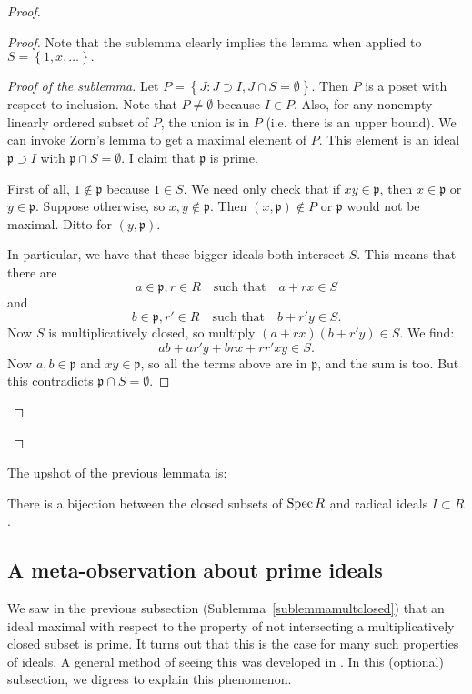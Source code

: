 \begin{proof}
\begin{proof}
Note that the sublemma clearly implies the lemma when applied to
$S =
\left\{1, x, \dots\right\}.$

\begin{proof}[Proof of the sublemma]
Let $P = \left\{J: J \supset I, J \cap S = \emptyset \right\}$.
Then $P$ is a
poset with respect to inclusion. Note that $P \neq \emptyset$
because $I \in P$. Also,
for any nonempty linearly ordered subset of $P$, the union is in
$P$ (i.e. there is an
upper bound).  
We can invoke Zorn's lemma to get a maximal element of $P$. This
element is an
ideal $\mathfrak{p} \supset I$ with $\mathfrak{p} \cap S =
\emptyset$. I claim
that $\mathfrak{p}$ is prime.

First of all, $1 \notin \mathfrak{p}$ because $1 \in S$. We need
only check
that if $xy \in \mathfrak{p}$, then $x \in \mathfrak{p}$ or $y
\in
\mathfrak{p}$. Suppose otherwise, so $x,y \notin \mathfrak{p}$.
Then $(x,\mathfrak{p}) \notin P$ or
$\mathfrak{p}$ would not be maximal. Ditto for $(y,
\mathfrak{p})$.

In particular, we have that these bigger ideals both intersect
$S$. This means
that there are 
\[ a \in \mathfrak{p} , r \in R \quad \text{such that}\quad a+rx
\in S \]
and 
\[ b \in \mathfrak{p} , r' \in R \quad \text{such that}\quad
b+r'y \in S .\]
Now $S$ is multiplicatively closed, so multiply $(a+rx)(b+r'y)
\in S$.
We find:
\[ ab + ar'y+brx+rr'xy \in S.  \]
Now $a,b \in \mathfrak{p}$ and $xy \in \mathfrak{p}$, so all the
terms above are in $\mathfrak{p}$, and the sum is too. But this contradicts
$\mathfrak{p}
\cap S = \emptyset$. 
\end{proof}
\end{proof} 
\end{proof} 
The upshot of the previous lemmata is:
\begin{proposition}
There is a bijection between the closed subsets of $\operatorname{Spec} R$ and
radical ideals
$I \subset R$.
\end{proposition}

\subsection{A meta-observation about prime ideals}

We saw in the previous subsection (Sublemma~\ref{sublemmamultclosed})
that an ideal maximal with respect to the property of not intersecting a
multiplicatively closed subset is prime.
It turns out that this is the case for many such properties of ideals.
A general method of seeing this was developed in \cite{LaRe08}.
In this (optional) subsection, we digress to explain this phenomenon.

